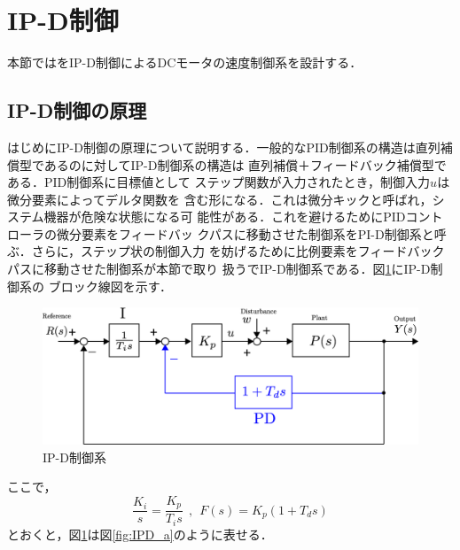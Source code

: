\documentclass[a4paper,12pt]{jarticle}
\begin{document}
\section{IP-D制御}
本節ではをIP-D制御によるDCモータの速度制御系を設計する．

\subsection{IP-D制御の原理}
はじめにIP-D制御の原理について説明する．一般的なPID制御系の構造は直列補
償型であるのに対してIP-D制御系の構造は
直列補償＋フィードバック補償型である．PID制御系に目標値として
ステップ関数が入力されたとき，制御入力$u$は微分要素によってデルタ関数を
含む形になる．これは微分キックと呼ばれ，システム機器が危険な状態になる可
能性がある．これを避けるためにPIDコントローラの微分要素をフィードバッ
クパスに移動させた制御系をPI-D制御系と呼ぶ．さらに，ステップ状の制御入力
を妨げるために比例要素をフィードバックパスに移動させた制御系が本節で取り
扱うでIP-D制御系である．図\ref{fig:IPD_b}にIP-D制御系の
ブロック線図を示す．
%
\begin{figure}[tbp]
 \begin{center}
  \includegraphics[width = 150mm]{fig/IPD_b.eps}
 \end{center}
 \caption{IP-D制御系}
 \label{fig:IPD_b}
\end{figure}
%
ここで，
%
\begin{equation}
 \frac{K_i}{s} = \frac{K_p}{T_is} \ \ , \ \ F(s) = K_p(1+T_d s)
\end{equation}
%
とおくと，図\ref{fig:IPD_b}は図\ref{fig:IPD_a}のように表せる．
%
\end{document}
